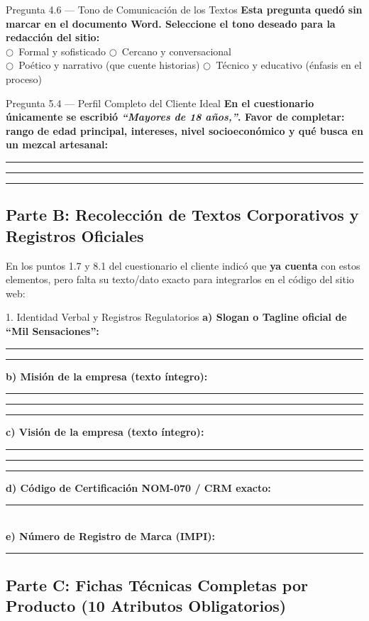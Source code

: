 \documentclass[11pt,letterpaper]{article}
\newcommand{\uradio}{$\bigcirc$}
\newcommand{\fillline}[1][1.0\linewidth]{%
    \par\vspace{0.35em}\noindent\textcolor{gray!70}{\rule{#1}{0.5pt}}\par\vspace{0.25em}%
}
\begin{document}
\begin{pendingbox}{Pregunta 4.6 — Tono de Comunicación de los Textos}
\textbf{Esta pregunta quedó sin marcar en el documento Word. Seleccione el tono deseado para la redacción del sitio:}\\[0.4em]
\uradio\ Formal y sofisticado \qquad
\uradio\ Cercano y conversacional\\[0.25em]
\uradio\ Poético y narrativo (que cuente historias) \qquad
\uradio\ Técnico y educativo (énfasis en el proceso)
\end{pendingbox}

\begin{pendingbox}{Pregunta 5.4 — Perfil Completo del Cliente Ideal}
\textbf{En el cuestionario únicamente se escribió \textit{``Mayores de 18 años,''}. Favor de completar: rango de edad principal, intereses, nivel socioeconómico y qué busca en un mezcal artesanal:}
\fillline
\fillline
\fillline
\end{pendingbox}

\newpage

\subsection{Parte B: Recolección de Textos Corporativos y Registros Oficiales}

En los puntos 1.7 y 8.1 del cuestionario el cliente indicó que \textbf{ya cuenta} con estos elementos, pero falta su texto/dato exacto para integrarlos en el código del sitio web:

\begin{pendingbox}{1. Identidad Verbal y Registros Regulatorios}
\textbf{a) Slogan o Tagline oficial de ``Mil Sensaciones'':}
\fillline
\fillline

\textbf{b) Misión de la empresa (texto íntegro):}
\fillline
\fillline
\fillline

\textbf{c) Visión de la empresa (texto íntegro):}
\fillline
\fillline
\fillline

\textbf{d) Código de Certificación NOM-070 / CRM exacto:} \rule{7.5cm}{0.5pt}\\[0.6em]
\textbf{e) Número de Registro de Marca (IMPI):} \rule{8.8cm}{0.5pt}
\end{pendingbox}

\subsection{Parte C: Fichas Técnicas Completas por Producto (10 Atributos Obligatorios)}
\end{document}
